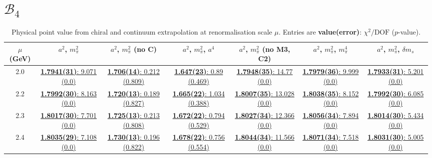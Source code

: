 \documentclass[12pt]{extarticle}
\begin{document}
\section{$\mathcal{B}_4$}
\begin{table}[h!]
\begin{center}
\begin{tabular}{|c|c|c|c|c|c|c|}
\hline
$\mu$ (GeV) & $a^2$, $m_\pi^2$& $a^2$, $m_\pi^2$ (no C)& $a^2$, $m_\pi^2$, $a^4$& $a^2$, $m_\pi^2$ (no M3, C2)& $a^2$, $m_\pi^2$, $m_\pi^4$& $a^2$, $m_\pi^2$, $\delta m_s$\\
\hline
2.0& \hyperlink{SSpPP/SUSY/bag_a2m2_20.pdf.1}{\textbf{1.7941(31)}: 9.071 (0.0)} & \hyperlink{SSpPP/SUSY/bag_a2m2noC_20.pdf.1}{\textbf{1.706(14)}: 0.212 (0.809)} & \hyperlink{SSpPP/SUSY/bag_a2a4m2_20.pdf.1}{\textbf{1.647(23)}: 0.89 (0.469)} & \hyperlink{SSpPP/SUSY/bag_a2m2mcut_20.pdf.1}{\textbf{1.7948(35)}: 14.77 (0.0)} & \hyperlink{SSpPP/SUSY/bag_a2m2m4_20.pdf.1}{\textbf{1.7979(36)}: 9.999 (0.0)} & \hyperlink{SSpPP/SUSY/bag_a2m2delm_20.pdf.1}{\textbf{1.7933(31)}: 5.201 (0.0)}\\
2.2& \hyperlink{SSpPP/SUSY/bag_a2m2_22.pdf.1}{\textbf{1.7992(30)}: 8.163 (0.0)} & \hyperlink{SSpPP/SUSY/bag_a2m2noC_22.pdf.1}{\textbf{1.720(13)}: 0.189 (0.827)} & \hyperlink{SSpPP/SUSY/bag_a2a4m2_22.pdf.1}{\textbf{1.665(22)}: 1.034 (0.388)} & \hyperlink{SSpPP/SUSY/bag_a2m2mcut_22.pdf.1}{\textbf{1.8007(35)}: 13.028 (0.0)} & \hyperlink{SSpPP/SUSY/bag_a2m2m4_22.pdf.1}{\textbf{1.8038(35)}: 8.152 (0.0)} & \hyperlink{SSpPP/SUSY/bag_a2m2delm_22.pdf.1}{\textbf{1.7992(30)}: 6.085 (0.0)}\\
2.3& \hyperlink{SSpPP/SUSY/bag_a2m2_23.pdf.1}{\textbf{1.8017(30)}: 7.701 (0.0)} & \hyperlink{SSpPP/SUSY/bag_a2m2noC_23.pdf.1}{\textbf{1.725(13)}: 0.213 (0.808)} & \hyperlink{SSpPP/SUSY/bag_a2a4m2_23.pdf.1}{\textbf{1.672(22)}: 0.794 (0.529)} & \hyperlink{SSpPP/SUSY/bag_a2m2mcut_23.pdf.1}{\textbf{1.8027(34)}: 12.366 (0.0)} & \hyperlink{SSpPP/SUSY/bag_a2m2m4_23.pdf.1}{\textbf{1.8056(34)}: 7.894 (0.0)} & \hyperlink{SSpPP/SUSY/bag_a2m2delm_23.pdf.1}{\textbf{1.8014(30)}: 5.434 (0.0)}\\
2.4& \hyperlink{SSpPP/SUSY/bag_a2m2_24.pdf.1}{\textbf{1.8035(29)}: 7.108 (0.0)} & \hyperlink{SSpPP/SUSY/bag_a2m2noC_24.pdf.1}{\textbf{1.730(13)}: 0.196 (0.822)} & \hyperlink{SSpPP/SUSY/bag_a2a4m2_24.pdf.1}{\textbf{1.678(22)}: 0.756 (0.554)} & \hyperlink{SSpPP/SUSY/bag_a2m2mcut_24.pdf.1}{\textbf{1.8044(34)}: 11.566 (0.0)} & \hyperlink{SSpPP/SUSY/bag_a2m2m4_24.pdf.1}{\textbf{1.8071(34)}: 7.518 (0.0)} & \hyperlink{SSpPP/SUSY/bag_a2m2delm_24.pdf.1}{\textbf{1.8031(30)}: 5.005 (0.0)}\\
\hline
\end{tabular}
\caption{Physical point value from chiral and continuum extrapolation at renormalisation scale $\mu$. Entries are \textbf{value(error)}: $\chi^2/\text{DOF}$ ($p$-value).}
\end{center}
\end{table}
\end{document}
